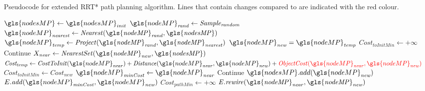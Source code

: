 \newpage
\begin{algorithm}[H]
  \caption{Pseudocode for extended \ac{RRT*} path planning algorithm. Lines that contain changes compared to  are indicated with the red colour.}%
  \label{pseudocode:modified_proposed_rrt_star}
  \begin{algorithmic}[1]
    \State $\gls{nodesMP} \leftarrow \gls{nodesMP}_{init}$
        \State $\gls{nodeMP}_\mathit{rand} \leftarrow \mathit{Sample_{random}}$ 
      \State $\gls{nodeMP}_\mathit{nearest} \leftarrow \mathit{Nearest(\gls{nodeMP}_{rand}, \gls{nodesMP})}$
      \State $\gls{nodeMP}_\mathit{temp} \leftarrow \mathit{Project(\gls{nodeMP}_{rand}, \gls{nodeMP}_{nearest})}$
      \State $\gls{nodeMP}_\mathit{new} = \gls{nodeMP}_\mathit{temp}$
      \State $\mathit{Cost_{toInitMin}} \leftarrow +\infty$ 
      \Else
      \State Continue
      \EndIf
      \State $X_\mathit{near} \leftarrow \mathit{NearestSet(\gls{nodeMP}_{new}, \gls{nodesMP})}$ 
    \State $\mathit{Cost_{temp}} \leftarrow \mathit{CostToInit}(\gls{nodeMP}_\mathit{near}) + \mathit{Distance}(\gls{nodeMP}_\mathit{near}, \gls{nodeMP}_\mathit{new}) + \textcolor{red}{\mathit{ObjectCost}(\gls{nodeMP}_\mathit{near}, \gls{nodeMP}_\mathit{new})}$
      \State $\mathit{Cost_{toInitMin}} \leftarrow \mathit{Cost_{new}}$
      \State $\gls{nodeMP}_\mathit{minCost} \leftarrow \gls{nodeMP}_\mathit{near}$
      \EndIf
      \EndFor
          \State Continue
      \Else
      \State $\gls{nodesMP}.add(\gls{nodeMP}_\mathit{new})$
      \State $E.\mathit{add}(\gls{nodeMP}_\mathit{minCost}, \gls{nodeMP}_\mathit{new})$
      \EndIf
      \State $\mathit{Cost_{pathMin}} \leftarrow +\infty$ 
      \State $\mathit{E.rewire(\gls{nodeMP}_{near}, \gls{nodeMP}_{new})}$
      \EndIf
      \Else {}


\end{algorithmic}
\end{algorithm}
